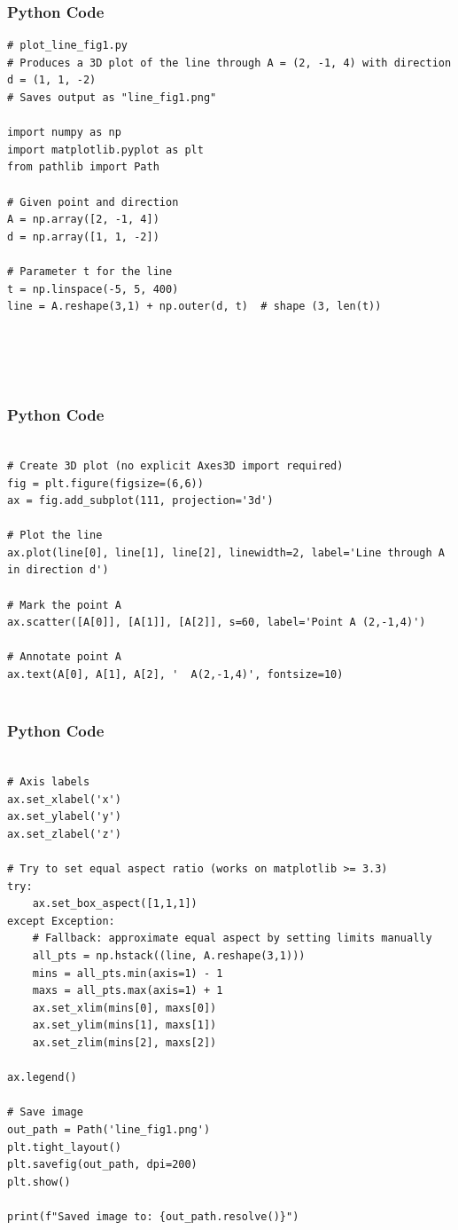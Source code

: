 \documentclass{beamer}
\begin{document}
\begin{frame}[fragile]
    \frametitle{Python Code}
    \begin{lstlisting}
# plot_line_fig1.py
# Produces a 3D plot of the line through A = (2, -1, 4) with direction d = (1, 1, -2)
# Saves output as "line_fig1.png"

import numpy as np
import matplotlib.pyplot as plt
from pathlib import Path

# Given point and direction
A = np.array([2, -1, 4])
d = np.array([1, 1, -2])

# Parameter t for the line
t = np.linspace(-5, 5, 400)
line = A.reshape(3,1) + np.outer(d, t)  # shape (3, len(t))





    \end{lstlisting}
\end{frame}

\begin{frame}[fragile]
    \frametitle{Python Code}
    \begin{lstlisting}
    
# Create 3D plot (no explicit Axes3D import required)
fig = plt.figure(figsize=(6,6))
ax = fig.add_subplot(111, projection='3d')

# Plot the line
ax.plot(line[0], line[1], line[2], linewidth=2, label='Line through A in direction d')

# Mark the point A
ax.scatter([A[0]], [A[1]], [A[2]], s=60, label='Point A (2,-1,4)')

# Annotate point A
ax.text(A[0], A[1], A[2], '  A(2,-1,4)', fontsize=10)


    \end{lstlisting}
\end{frame}

\begin{frame}[fragile]
    \frametitle{Python Code}
    \begin{lstlisting}
    
# Axis labels
ax.set_xlabel('x')
ax.set_ylabel('y')
ax.set_zlabel('z')

# Try to set equal aspect ratio (works on matplotlib >= 3.3)
try:
    ax.set_box_aspect([1,1,1])
except Exception:
    # Fallback: approximate equal aspect by setting limits manually
    all_pts = np.hstack((line, A.reshape(3,1)))
    mins = all_pts.min(axis=1) - 1
    maxs = all_pts.max(axis=1) + 1
    ax.set_xlim(mins[0], maxs[0])
    ax.set_ylim(mins[1], maxs[1])
    ax.set_zlim(mins[2], maxs[2])

ax.legend()

# Save image
out_path = Path('line_fig1.png')
plt.tight_layout()
plt.savefig(out_path, dpi=200)
plt.show()

print(f"Saved image to: {out_path.resolve()}")


    \end{lstlisting}
\end{frame}
\end{document}
